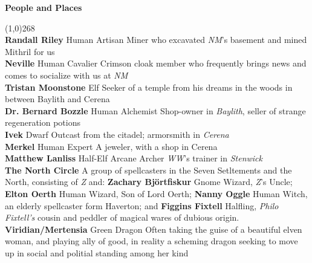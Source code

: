 \documentclass[letterpaper]{article}
\newcommand{\colline}{\line(1,0){268} \\}
\newcommand{\e}[1]{\emph{#1}}
\newcommand{\B}[1]{\textbf{#1}}
\newenvironment{notesection}[1]
{ {\huge \B{#1}} \par
\vspace{-0.75em}
\colline
\begingroup\fontsize{9pt}{12pt}\selectfont}
{\endgroup}
\newcommand{\person}[3]{\B{#1
    \ifstrequal{#2}{M}{{\color{ProcessBlue}\male}}{%
    \ifstrequal{#2}{F}{\color{VioletRed}\female}{}}}{\scriptsize #3}}
\begin{document}
\begin{notesection}{People and Places}
\person{Randall Riley}{M}{Human Artisan} Miner who excavated \e{NM}'s basement and mined Mithril for us\\
\person{Neville}{M}{Human Cavalier} Crimson cloak member who frequently brings news and comes to socialize with us at \e{NM}\\
\person{Tristan Moonstone}{M}{Elf} Seeker of a temple from his dreams in the woods in between Baylith and Cerena\\
\person{Dr. Bernard Bozzle}{M}{Human Alchemist} Shop-owner in \e{Baylith}, seller of strange regeneration potions\\
\person{Ivek}{M}{Dwarf} Outcast from the citadel; armorsmith in \e{Cerena}\\
\person{Merkel}{F}{Human Expert} A jeweler, with a shop in Cerena\\
\person{Matthew Lanliss}{M}{Half-Elf Arcane Archer} \e{WW}'s trainer in \e{Stenwick}\\
\B{The North Circle} A group of spellcasters in the Seven Setltements and the North, consisting of \e{Z} and: \person{Zachary Bj\"{o}rtfiskur}{M}{Gnome Wizard}, \e{Z}'s Uncle; \person{Elton Oerth}{M}{Human Wizard}, Son of Lord Oerth; \person{Nanny Oggle}{F}{Human Witch}, an elderly spellcaster form Haverton; and \person{Figgins Fixtell}{M}{Halfling}, \e{Philo Fixtell's} cousin and peddler of magical wares of dubious origin. \\
\person{Viridian/Mertensia}{F}{Green Dragon} Often taking the guise of a beautiful elven woman, and playing ally of good, in reality a scheming dragon seeking to move up in social and politial standing among her kind \\


\end{notesection}
\end{document}
